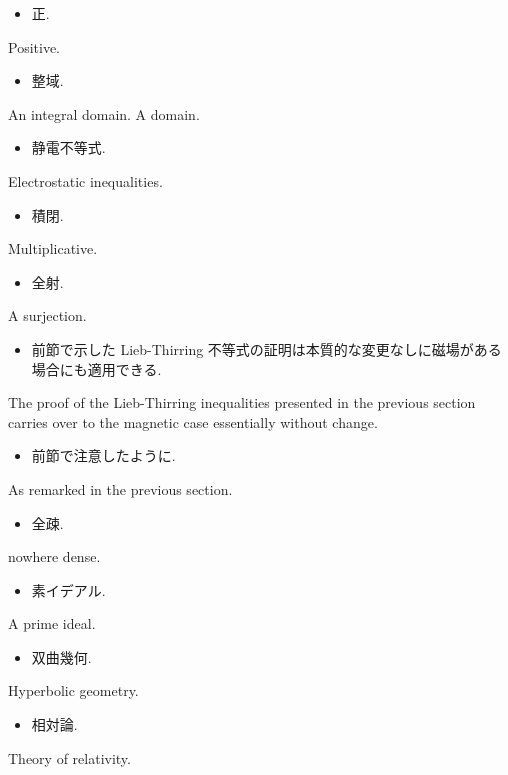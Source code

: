 \documentclass[openany, a4paper, oneside]{jsbook}
\begin{document}
\begin{itemize}
\item 正.
\end{itemize}
Positive.

\begin{itemize}
\item 整域.
\end{itemize}
An integral domain. A domain.

\begin{itemize}
\item 静電不等式. \cite{LiebSeiringer1}
\end{itemize}
Electrostatic inequalities.

\begin{itemize}
\item 積閉.
\end{itemize}
Multiplicative.

\begin{itemize}
\item 全射.
\end{itemize}
A surjection.

\begin{itemize}
\item 前節で示した Lieb-Thirring 不等式の証明は本質的な変更なしに磁場がある場合にも適用できる. \cite{LiebSeiringer1}
\end{itemize}
The proof of the Lieb-Thirring inequalities presented in the previous section
carries over to the magnetic case essentially without change.

\begin{itemize}
\item 前節で注意したように. \cite{LiebSeiringer1}
\end{itemize}
As remarked in the previous section.

\begin{itemize}
\item 全疎.
\end{itemize}
nowhere dense.

\begin{itemize}
\item 素イデアル.
\end{itemize}
A prime ideal.

\begin{itemize}
\item 双曲幾何.
\end{itemize}
Hyperbolic geometry.

\begin{itemize}
\item 相対論.
\end{itemize}
Theory of relativity.
\end{document}
